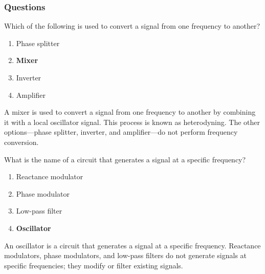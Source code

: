 \subsubsection*{Questions}

\begin{tcolorbox}[colback=gray!10!white,colframe=black!75!black,title={T7A03}]
    Which of the following is used to convert a signal from one frequency to another?
    \begin{enumerate}[label=\Alph*),noitemsep]
        \item Phase splitter
        \item \textbf{Mixer}
        \item Inverter
        \item Amplifier
    \end{enumerate}
\end{tcolorbox}

A mixer is used to convert a signal from one frequency to another by combining it with a local oscillator signal. This process is known as heterodyning. The other options—phase splitter, inverter, and amplifier—do not perform frequency conversion.

\begin{tcolorbox}[colback=gray!10!white,colframe=black!75!black,title={T7A05}]
    What is the name of a circuit that generates a signal at a specific frequency?
    \begin{enumerate}[label=\Alph*),noitemsep]
        \item Reactance modulator
        \item Phase modulator
        \item Low-pass filter
        \item \textbf{Oscillator}
    \end{enumerate}
\end{tcolorbox}

An oscillator is a circuit that generates a signal at a specific frequency. Reactance modulators, phase modulators, and low-pass filters do not generate signals at specific frequencies; they modify or filter existing signals.
